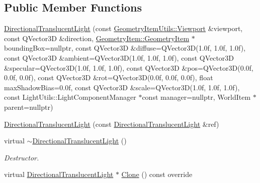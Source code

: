 \subsection*{Public Member Functions}
\begin{DoxyCompactItemize}
\item 
\mbox{\hyperlink{class_geometry_engine_1_1_geometry_world_item_1_1_geometry_light_1_1_directional_translucent_light_a4367b3ef7b69f251dbb702f06e693a94}{Directional\+Translucent\+Light}} (const \mbox{\hyperlink{class_geometry_engine_1_1_geometry_item_utils_1_1_viewport}{Geometry\+Item\+Utils\+::\+Viewport}} \&viewport, const Q\+Vector3D \&direction, \mbox{\hyperlink{class_geometry_engine_1_1_geometry_world_item_1_1_geometry_item_1_1_geometry_item}{Geometry\+Item\+::\+Geometry\+Item}} $\ast$bounding\+Box=nullptr, const Q\+Vector3D \&diffuse=Q\+Vector3D(1.\+0f, 1.\+0f, 1.\+0f), const Q\+Vector3\+D \&ambient=\+Q\+Vector3\+D(1.\+0f, 1.\+0f, 1.\+0f), const Q\+Vector3\+D \&specular=\+Q\+Vector3\+D(1.\+0f, 1.\+0f, 1.\+0f), const Q\+Vector3\+D \&pos=\+Q\+Vector3\+D(0.\+0f, 0.\+0f, 0.\+0f), const Q\+Vector3\+D \&rot=\+Q\+Vector3\+D(0.\+0f, 0.\+0f, 0.\+0f), float max\+Shadow\+Bias=0.\+0f, const Q\+Vector3\+D \&scale=\+Q\+Vector3\+D(1.\+0f, 1.\+0f, 1.\+0f), const Light\+Utils\+::\+Light\+Component\+Manager $\ast$const manager=nullptr, World\+Item $\ast$parent=nullptr)
\item 
\mbox{\hyperlink{class_geometry_engine_1_1_geometry_world_item_1_1_geometry_light_1_1_directional_translucent_light_a47fb6ff0f8184afb4eb99b8210f43bce}{Directional\+Translucent\+Light}} (const \mbox{\hyperlink{class_geometry_engine_1_1_geometry_world_item_1_1_geometry_light_1_1_directional_translucent_light}{Directional\+Translucent\+Light}} \&ref)
\item 
\mbox{\label{class_geometry_engine_1_1_geometry_world_item_1_1_geometry_light_1_1_directional_translucent_light_a586e52483c53a4fa90cb26dc1f89909b}} 
virtual \mbox{\hyperlink{class_geometry_engine_1_1_geometry_world_item_1_1_geometry_light_1_1_directional_translucent_light_a586e52483c53a4fa90cb26dc1f89909b}{$\sim$\+Directional\+Translucent\+Light}} ()
\begin{DoxyCompactList}\small\item\em Destructor. \end{DoxyCompactList}\item 
virtual \mbox{\hyperlink{class_geometry_engine_1_1_geometry_world_item_1_1_geometry_light_1_1_directional_translucent_light}{Directional\+Translucent\+Light}} $\ast$ \mbox{\hyperlink{class_geometry_engine_1_1_geometry_world_item_1_1_geometry_light_1_1_directional_translucent_light_aca2d4b89caa4a3059922f49ecf81c8d5}{Clone}} () const override
\end{DoxyCompactItemize}
